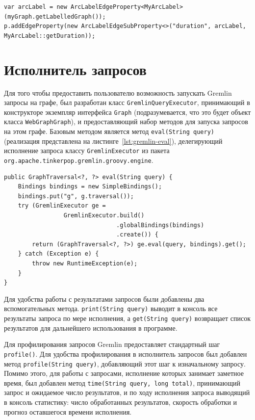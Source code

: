 \documentclass[times,specification,annotation]{itmo-student-thesis}
\begin{document}
\begin{lstlisting}[float=!h,caption={Пример декомпозиции метки},label={lst:arclabel}]
var arcLabel = new ArcLabelEdgeProperty<MyArcLabel>(myGraph.getLabelledGraph());
p.addEdgeProperty(new ArcLabelEdgeSubProperty<>("duration", arcLabel, MyArcLabel::getDuration));
\end{lstlisting}

\section{Исполнитель запросов}\label{sec:executor}

Для того чтобы предоставить пользователю возможность запускать Gremlin запросы на графе, был разработан класс \texttt{GremlinQueryExecutor}, принимающий в конструкторе экземпляр интерфейса \texttt{Graph} (подразумевается, что это будет объект класса \texttt{WebGraphGraph}), и предоставляющий набор методов для запуска запросов на этом графе. Базовым методом является метод \texttt{eval(String query)} (реализация представлена на листинге~\ref{lst:gremlin-eval}), делегирующий исполнение запроса классу \texttt{GremlinExecutor} из пакета \texttt{org.apache.tinkerpop.gremlin.groovy.engine}.

\begin{lstlisting}[float=!h,caption={Реализация исполнителя Gremlin запросов},label={lst:gremlin-eval}]
public GraphTraversal<?, ?> eval(String query) {
    Bindings bindings = new SimpleBindings();
    bindings.put("g", g.traversal());
    try (GremlinExecutor ge =
                 GremlinExecutor.build()
                                .globalBindings(bindings)
                                .create()) {
        return (GraphTraversal<?, ?>) ge.eval(query, bindings).get();
    } catch (Exception e) {
        throw new RuntimeException(e);
    }
}
\end{lstlisting}

Для удобства работы с результатами запросов были добавлены два вспомогательных метода. \texttt{print(String query)} выводит в консоль все результаты запроса по мере исполнения, а \texttt{get(String query)} возвращает список результатов для дальнейшего использования в программе.

Для профилирования запросов Gremlin предоставляет стандартный шаг \texttt{profile()}. Для удобства профилирования в исполнитель запросов был добавлен метод \texttt{profile(String query)}, добавляющий этот шаг к изначальному запросу. Помимо этого, для работы с запросами, исполнение которых занимает заметное время, был добавлен метод \texttt{time(String query, long total)}, принимающий запрос и ожидаемое число результатов, и по ходу исполнения запроса выводящий в консоль статистику: число обработанных результатов, скорость обработки и прогноз оставшегося времени исполнения.
\end{document}
